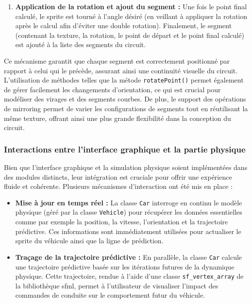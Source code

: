 \begin{enumerate}
    \item \textbf{Application de la rotation et ajout du segment :}
    Une fois le point final calculé, le \gls{sprite} est tourné à l’angle désiré (en veillant à appliquer la rotation après le calcul afin d’éviter une double rotation).
    Finalement, le segment (contenant la texture, la rotation, le point de départ et le point final calculé) est ajouté à la liste des segments du circuit.
\end{enumerate}

Ce mécanisme garantit que chaque segment est correctement positionné par rapport à celui qui le précède, assurant ainsi une continuité visuelle du circuit.
L'utilisation de méthodes telles que la métode \texttt{rotatePoint()} permet également de gérer facilement les changements d'orientation, ce qui est crucial pour modéliser des virages et des segments courbes.
De plus, le support des opérations de mirroring permet de varier les configurations de segments tout en réutilisant la même texture, offrant ainsi une plus grande flexibilité dans la conception du circuit.


\subsubsection{Interactions entre l'interface graphique et la partie physique}\label{subsubsec:interactions-entre-l-interface-graphique-et-la-partie-physique}
Bien que l'interface graphique et la simulation physique soient implémentées dans des modules distincts, leur intégration est cruciale pour offrir une expérience fluide et cohérente.
Plusieurs mécanismes d'interaction ont été mis en place :

\begin{itemize}
    \item \textbf{Mise à jour en temps réel :} La classe \texttt{Car} interroge en continu le modèle physique (géré par la classe \texttt{Vehicle}) pour récupérer les données essentielles comme par exemple la position, la vitesse, l'orientation et la trajectoire prédictive.
    Ces informations sont immédiatement utilisées pour actualiser le \gls{sprite} du véhicule ainsi que la ligne de prédiction.
    \item \textbf{Traçage de la trajectoire prédictive :} En parallèle, la classe \texttt{Car} calcule une trajectoire prédictive basée sur les itérations futures de la dynamique physique.
    Cette trajectoire, rendue à l'aide d'une classe \texttt{\gls{sf_vertex_array}}\cite{sfml_sf_vertexarray} de la bibliothèque \gls{sfml}, permet à l'utilisateur de visualiser l'impact des commandes de conduite sur le comportement futur du véhicule.
\end{itemize}

